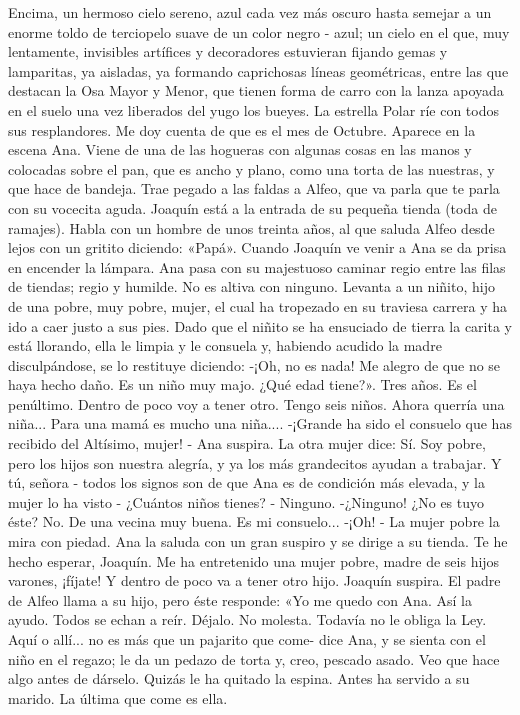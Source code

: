 \documentclass[12pt]{book} %
\begin{document}
Encima, un hermoso cielo sereno, azul cada vez más oscuro hasta semejar a un enorme toldo de terciopelo suave de un 
color negro - azul; un cielo en el que, muy lentamente, invisibles artífices y decoradores estuvieran fijando gemas y lamparitas, ya aisladas, ya formando caprichosas líneas geométricas, entre las que destacan la Osa Mayor y Menor, que tienen forma de carro con la lanza apoyada en el suelo una vez liberados del yugo los bueyes. La estrella Polar ríe con todos sus resplandores. 
Me doy cuenta de que es el mes de Octubre.  
Aparece en la escena Ana. Viene de una de las hogueras con algunas cosas en las manos y colocadas sobre el pan, que 
es ancho y plano, como una torta de las nuestras, y que hace de bandeja. Trae pegado a las faldas a Alfeo, que va parla que te parla con su vocecita aguda. Joaquín está a la entrada de su pequeña tienda (toda de ramajes). Habla con un hombre de unos treinta años, al que saluda Alfeo desde lejos con un gritito diciendo: «Papá». Cuando Joaquín ve venir a Ana se da prisa en encender la lámpara. 
Ana pasa con su majestuoso caminar regio entre las filas de tiendas; regio y humilde. No es altiva con ninguno. Levanta 
a un niñito, hijo de una pobre, muy pobre, mujer, el cual ha tropezado en su traviesa carrera y ha ido a caer justo a sus pies. Dado que el niñito se ha ensuciado de tierra la carita y está llorando, ella le limpia y le consuela y, habiendo acudido la madre disculpándose, se lo restituye diciendo: 
-¡Oh, no es nada! Me alegro de que no se haya hecho daño. Es un niño muy majo. ¿Qué edad tiene?». 
Tres años. Es el penúltimo. Dentro de poco voy a tener otro. Tengo seis niños. Ahora querría una niña... Para una mamá es mucho una niña.... 
-¡Grande ha sido el consuelo que has recibido del Altísimo, mujer! - Ana suspira. 
La otra mujer dice: 
Sí. Soy pobre, pero los hijos son nuestra alegría, y ya los más grandecitos ayudan a trabajar. Y tú, señora - todos los 
signos son de que Ana es de condición más elevada, y la mujer lo ha visto - ¿Cuántos niños tienes? - Ninguno. 
-¿Ninguno! ¿No es tuyo éste? 
No. De una vecina muy buena. Es mi consuelo... 
 	-¡Oh! - La mujer pobre la mira con piedad. 
Ana la saluda con un gran suspiro y se dirige a su tienda. 
Te he hecho esperar, Joaquín. Me ha entretenido una mujer pobre, madre de seis hijos varones, ¡fíjate! Y dentro de 
poco va a tener otro hijo. 
Joaquín suspira. 
El padre de Alfeo llama a su hijo, pero éste responde: «Yo me quedo con Ana. Así la ayudo. 
Todos se echan a reír. 
Déjalo. No molesta. Todavía no le obliga la Ley. Aquí o allí... no es más que un pajarito que come- dice Ana, y se sienta con el niño en el regazo; le da un pedazo de torta y, creo, pescado asado. Veo que hace algo antes de dárselo. Quizás le ha quitado la espina. Antes ha servido a su marido. La última que come es ella. 
\end{document}

